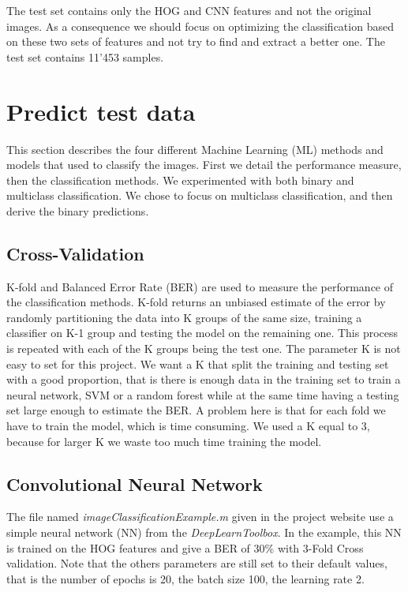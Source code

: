 \documentclass{article} %
\begin{document}
The test set contains only the HOG and CNN features and not the original images.
As a consequence we should focus on optimizing the classification based on these two sets of features and not try to find and extract a better one.
The test set contains 11'453 samples.

\section{Predict test data}

This section describes the four different Machine Learning (ML) methods and models that used to classify the images. 
First we detail the performance measure, then the classification methods.
We experimented with both binary and multiclass classification.
We chose to focus on multiclass classification, and then derive the binary predictions.


\subsection{Cross-Validation}

K-fold and Balanced Error Rate (BER) are used to measure the performance of the classification methods.
K-fold returns an unbiased estimate of the error by randomly partitioning the data into K groups of the same size, training a classifier on K-1 group and testing the model on the remaining one. This process is repeated with each of the K groups being the test one. %
The parameter K is not easy to set for this project. 
We want a K that split the training and testing set with a good proportion, that is there is enough data in the training set to train a neural network, SVM or a random forest while at the same time having a testing set large enough to estimate the BER.
A problem here is that for each fold we have to train the model, which is time consuming. 
We used a K equal to 3, because for larger K we waste too much time training the model.

\subsection{Convolutional Neural Network}
The file named \emph{imageClassificationExample.m} given in the project website use a simple neural network (NN) from the \emph{DeepLearnToolbox}.
In the example, this NN is trained on the HOG features and give a BER of 30\% with 3-Fold Cross validation. Note that the others parameters are still set to their default values, that is the number of epochs is 20, the batch size 100, the learning rate 2.
\end{document}

